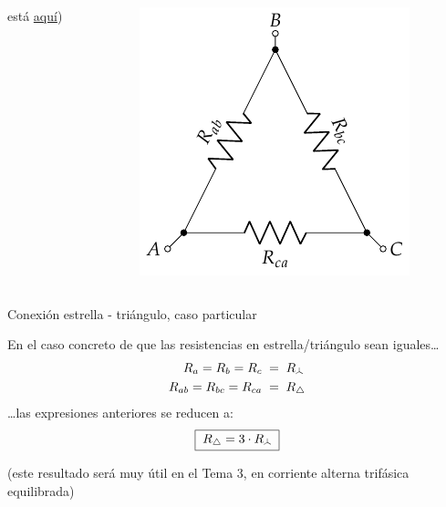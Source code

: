 \documentclass[aspectratio=169, xcolor={usenames,svgnames,dvipsnames}]{beamer}
\newcommand\wye{\scalerel*{\stackengine{-1pt}{%
  \rotatebox[origin=c]{30}{\rule{10pt}{.9pt}}\kern-1pt%
  \rotatebox[origin=c]{-30}{\rule{10pt}{1.3pt}}}{%
  \rule{.9pt}{10pt}}{O}{c}{F}{F}{S}}{\Delta}} %
\begin{document}
\begin{frame}
\begin{columns}
\begin{column}{0.4\columnwidth}
{    está \href{https://spinningnumbers.org/a/delta-wye-derivations.html\#text-y-to-delta-derivation-with-conductance}{aquí})} %
    \end{column}
    \begin{column}{0.3\columnwidth}
    \begin{center}
    \includegraphics[width=.9\linewidth]{../figs/Conexion_Triangulo.pdf}
    \end{center}
    \end{column}
    \end{columns}
\end{frame}


\begin{frame}{Conexión estrella - triángulo, \hspace{3mm}caso particular}
    
    En el caso concreto de que las \alert{resistencias} en estrella/triángulo sean \alert{iguales}\ldots{}
    \begin{align*}
      R_a=R_b=R_c \; &= \; R_{\wye}\\
      R_{ab}=R_{bc}=R_{ca} \; &= \; R_{\triangle}
    \end{align*}
    \ldots{}las expresiones anteriores se reducen a:
    \begin{equation*}
      \boxed{\; R_{\triangle} = 3\cdot R_{\wye} \;}
    \end{equation*}
    
    \centering \small{(este resultado será muy útil en el Tema 3, en \alert{corriente alterna trifásica} equilibrada)}
\end{frame}
\end{document}

